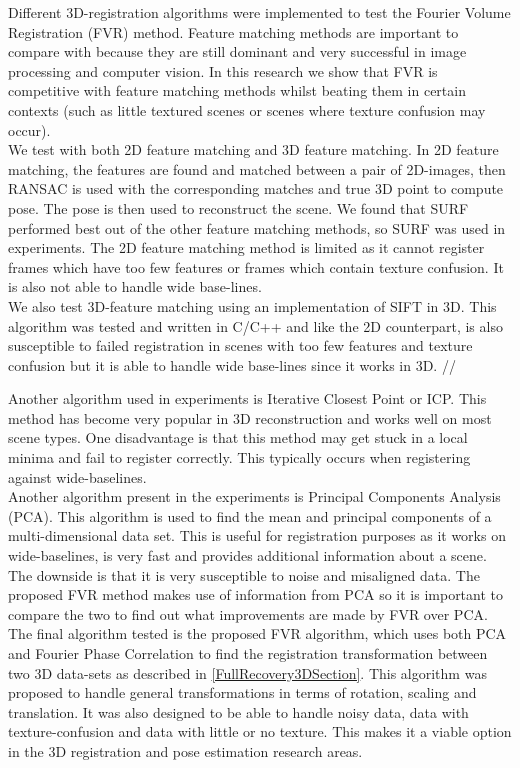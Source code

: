 Different 3D-registration algorithms were implemented to test the Fourier Volume Registration (FVR) method. Feature matching methods are important to compare with because they are still dominant and very successful in image processing and computer vision. In this research we show that FVR is competitive with feature matching methods whilst beating them in certain contexts (such as little textured scenes or scenes where texture confusion may occur). \\ 

We test with both 2D feature matching and 3D feature matching. In 2D feature matching, the features are found and matched between a pair of 2D-images, then RANSAC is used with the corresponding matches and true 3D point to compute pose. The pose is then used to reconstruct the scene. We found that SURF performed best out of the other feature matching methods, so SURF was used in experiments. The 2D feature matching method is limited as it cannot register frames which have too few features or frames which contain texture confusion. It is also not able to handle wide base-lines. \\

We also test 3D-feature matching using an implementation of SIFT in 3D. This algorithm was tested and written in C/C++ and like the 2D counterpart, is also susceptible to failed registration in scenes with too few features and texture confusion but it is able to handle wide base-lines since it works in 3D. //

Another algorithm used in experiments is Iterative Closest Point or ICP. This method has become very popular in 3D reconstruction and works well on most scene types. One disadvantage is that this method may get stuck in a local minima and fail to register correctly. This typically occurs when registering against wide-baselines. \\

Another algorithm present in the experiments is Principal Components Analysis (PCA). This algorithm is used to find the mean and principal components of a multi-dimensional data set. This is useful for registration purposes as it works on wide-baselines, is very fast and provides additional information about a scene. The downside is that it is very susceptible to noise and misaligned data. The proposed FVR method makes use of information from PCA so it is important to compare the two to find out what improvements are made by FVR over PCA. \\

The final algorithm tested is the proposed FVR algorithm, which uses both PCA and Fourier Phase Correlation to find the registration transformation between two 3D data-sets as described in \ref{FullRecovery3DSection}. This algorithm was proposed to handle general transformations in terms of rotation, scaling and translation. It was also designed to be able to handle noisy data, data with texture-confusion and data with little or no texture. This makes it a viable option in the 3D registration and pose estimation research areas.